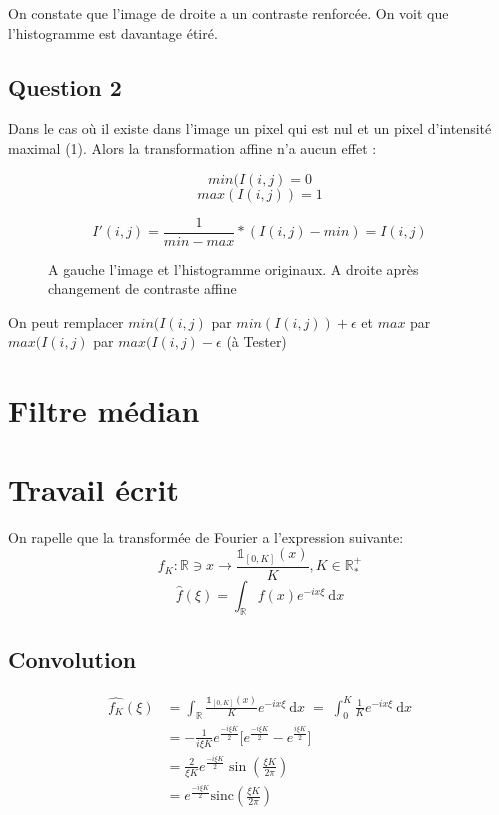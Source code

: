 \documentclass{article}
\begin{document}
On constate que l'image de droite a un contraste renforcée. On voit que l'histogramme est davantage étiré. 

\subsection*{Question 2}

Dans le cas où il existe dans l'image un pixel qui est nul et un pixel d'intensité maximal (1). Alors la transformation affine n'a aucun effet : 


$$min(I(i,j) = 0$$
$$max(I(i,j)) = 1$$
	
$$I'(i,j) = \frac{1}{min-max} * (I(i,j) - min) = I(i,j)$$


\begin{figure}[h]
		
	\caption{A gauche l'image et l'histogramme originaux. A droite après changement de contraste affine}
	
\end{figure}


On peut remplacer $min(I(i,j)$ par $min(I(i,j)) + \epsilon$ et $max$ par $max(I(i,j)$ par $max(I(i,j) - \epsilon$ (à Tester)


\section{Filtre médian}

\section{Travail écrit}
On rapelle que la transformée de Fourier a l'expression suivante:
$$ f_K : \mathbb{R} \ni x \rightarrow \frac{\mathds{1}_{[0, K]}(x)}{K}, K \in \mathbb{R}_*^+ $$
$$ \hat{f}(\xi) = \int_\mathbb{R} f(x) e^{-ix\xi} \:\mathrm{d}x$$

\subsection{Convolution}

\begin{equation*}\begin{split}
\hat{f_K}(\xi) 
&= \int_\mathbb{R} \frac{\mathds{1}_{[0, K]}(x)}{K} e^{-ix\xi} \:\mathrm{d}x \;=\; \int_0^{K} \frac{1}{K}e^{-ix\xi}\:\mathrm{d} x \\
&= -\frac{1}{i \xi K} e^{\frac{-i \xi K}{2}}\bigg [ e^{\frac{-i \xi K}{2}} - e^{\frac{i \xi K}{2}} \bigg] \\
&= \frac{2}{\xi K} e^{\frac{-i \xi K}{2}} \sin(\frac{\xi K}{2\pi})\\
&= e^{\frac{-i \xi K}{2}} \text{sinc}(\frac{\xi K}{2\pi})
\end{split}\end{equation*}
\end{document}
